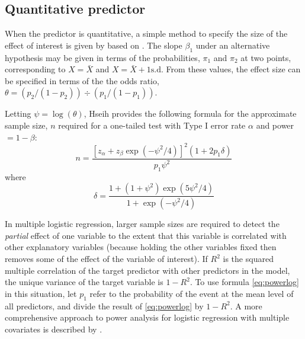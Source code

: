 \subsection{Quantitative predictor}
When the predictor is quantitative, 
a simple method to specify the size of the
effect of interest is given by \citet[p. 131]{Agresti:96}
based on \citet{Hsieh:89}.
The slope $\beta_1$ under an alternative hypothesis
may be given in terms of the probabilities, $\pi_1$
and $\pi_2$ at two points, corresponding to
$X = \bar{X}$ and $X = \bar{X} + 1\mbox{s.d.}$
From these values, the effect size
can be specified in terms of the the odds ratio, 
$\theta = (p_2/(1-p_2)) \div (p_1/(1-p_1))$.

Letting $\psi = \log ( \theta )$,  Hseih provides the following
formula for the approximate sample size, $n$ required for a
one-tailed test with Type I error rate $\alpha$ and power $=1-\beta$:
\begin{equation}\label{eq:powerlog}
n = \frac{[z_{\alpha} + z_{\beta} \exp( -\psi^2 /4) ]^2 (1 + 2 p_1 \delta )} { p_1 \psi^2}
\end{equation}
where 
\begin{equation*}
\delta = \frac{1 + (1 + \psi^2) \exp( 5 \psi^2 /4) } {1 + \exp( -\psi^2 /4) }
\end{equation*}

In multiple logistic regression, larger sample sizes are required to
detect the \emph{partial} effect of one variable to the extent that
this variable is correlated with other explanatory variables
(because holding the other variables fixed then removes some of the
effect of the variable of interest).
If $R^2$ is the squared multiple correlation of the target predictor
with other predictors in the model, the unique variance of the
target variable is $1-R^2$.
To use formula \eqref{eq:powerlog} in this situation, let
$p_1$ refer to the probability of the event at the mean level of all
predictors, and divide the result of \eqref{eq:powerlog}
by $1-R^2$.
A more comprehensive approach to power analysis for 
logistic regression with multiple
covariates is described by \citet{Whittemore:81}.

